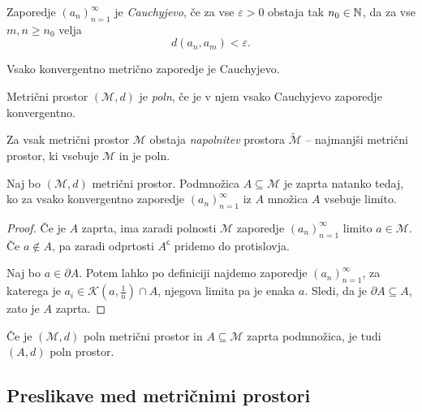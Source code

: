 \documentclass[12pt, a4paper]{article}
\begin{document}
\obvs

\begin{definicija}
Zaporedje $(a_n)_{n=1}^\infty$ je \emph{Cauchyjevo}, če za vse $\varepsilon>0$ obstaja tak $n_0\in\mathbb{N}$, da za vse $m,n\geq n_0$ velja
\[
d(a_n,a_m)<\varepsilon.
\]
\end{definicija}

\begin{trditev}
Vsako konvergentno metrično zaporedje je Cauchyjevo.
\end{trditev}

\obvs

\begin{definicija}
Metrični prostor $(\mathcal{M},d)$ je \emph{poln}, če je v njem vsako Cauchyjevo zaporedje konvergentno.
\end{definicija}

\begin{opomba}
Za vsak metrični prostor $\mathcal{M}$ obstaja \emph{napolnitev} prostora $\widetilde{\mathcal{M}}$ -- najmanjši metrični prostor, ki vsebuje $\mathcal{M}$ in je poln.
\end{opomba}

\begin{trditev}
Naj bo $(\mathcal{M},d)$ metrični prostor. Podmnožica $A\subseteq \mathcal{M}$ je zaprta natanko tedaj, ko za vsako konvergentno zaporedje $(a_n)_{n=1}^\infty$ iz $A$ množica $A$ vsebuje limito.
\end{trditev}

\begin{proof}
Če je $A$ zaprta, ima zaradi polnosti $\mathcal{M}$ zaporedje $(a_n)_{n=1}^\infty$ limito $a\in \mathcal{M}$. Če $a\not\in A$, pa zaradi odprtosti $A^\mathsf{c}$ pridemo do protislovja.

Naj bo $a\in\partial A$. Potem lahko po definiciji najdemo zaporedje $(a_n)_{n=1}^\infty$, za katerega je $a_i\in\mathcal{K}\left(a,\frac{1}{n}\right)\cap A$, njegova limita pa je enaka $a$. Sledi, da je $\partial A\subseteq A$, zato je $A$ zaprta.
\end{proof}

\begin{posledica}
Če je $(\mathcal{M},d)$ poln metrični prostor in $A\subseteq \mathcal{M}$ zaprta podmnožica, je tudi $(A,d)$ poln prostor.
\end{posledica}

\newpage

\subsection{Preslikave med metričnimi prostori}
\end{document}
